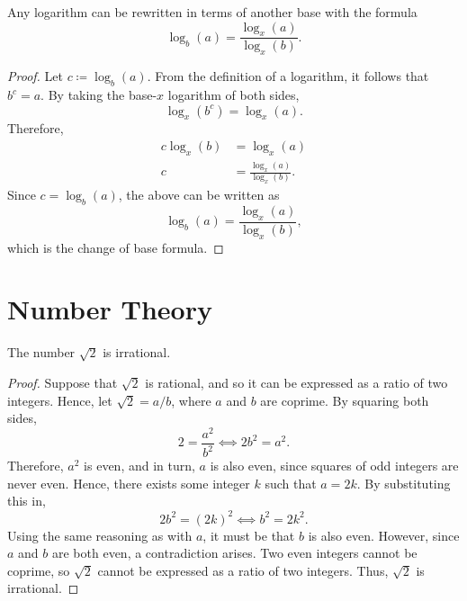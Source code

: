 \documentclass[headings=standardclasses]{scrartcl}
\begin{document}
\begin{theorem}
  Any logarithm can be rewritten in terms of another base with the formula
  \[ \log_{b}(a) = \frac{\log_{x}(a)}{\log_{x}(b)}. \]
\end{theorem}

\begin{proof}
  Let \(c \coloneqq \log_b(a)\). From the definition of a logarithm, it follows
  that \(b^c = a\). By taking the base-\(x\) logarithm of both sides,
  \begin{equation*}
      \log_x(b^c) = \log_x(a).
  \end{equation*}
  Therefore,
  \begin{align*}
      c\log_x(b) &= \log_x(a) \\
               c &= \frac{\log_x(a)}{\log_x(b)}.
  \end{align*}
  Since \(c = \log_b(a)\), the above can be written as
  \begin{equation*}
    \log_b(a) = \frac{\log_x(a)}{\log_x(b)},
  \end{equation*}
  which is the change of base formula.
\end{proof}

\section*{Number Theory}

\begin{result}
  The number \(\sqrt{2}\) is irrational.
\end{result}

\begin{proof}
  Suppose that \(\sqrt{2}\) is rational, and so it can be expressed as a ratio
  of two integers. Hence, let \(\sqrt{2} = a/b\), where \(a\) and \(b\) are
  coprime. By squaring both sides,
  \begin{equation*}
    2 = \frac{a^2}{b^2} ⟺ 2b^2 = a^2.
  \end{equation*}
  Therefore, \(a^2\) is even, and in turn, \(a\) is also even, since squares of
  odd integers are never even. Hence, there exists some integer \(k\) such that
  \(a = 2k\). By substituting this in,
  \begin{equation*}
    2b^2 = {(2k)}^2 ⟺ b^2 = 2k^2.
  \end{equation*}
  Using the same reasoning as with \(a\), it must be that \(b\) is also even.
  However, since \(a\) and \(b\) are both even, a contradiction arises. Two
  even integers cannot be coprime, so \(\sqrt{2}\) cannot be expressed as a
  ratio of two integers. Thus, \(\sqrt{2}\) is irrational.
\end{proof}
\end{document}
